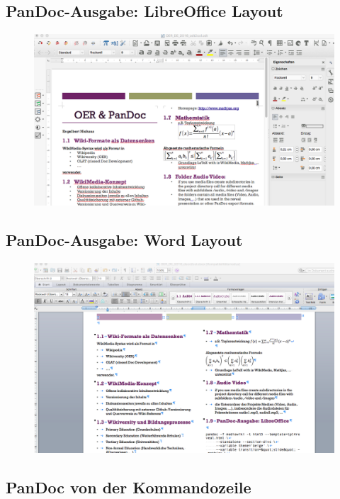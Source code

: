 \documentclass[]{article}
\begin{document}
\subsection{PanDoc-Ausgabe: LibreOffice
Layout}\label{pandoc-ausgabe-libreoffice-layout}

\begin{figure}[htbp]
\centering
\includegraphics[width=6.77083in]{./images/PanDocLibreOffice2col.png}
\caption{}
\end{figure}

\subsection{PanDoc-Ausgabe: Word
Layout}\label{pandoc-ausgabe-word-layout}

\begin{figure}[htbp]
\centering
\includegraphics[width=6.77083in]{./images/PanDocWord2col.png}
\caption{}
\end{figure}

\subsection{PanDoc von der
Kommandozeile}\label{pandoc-von-der-kommandozeile}
\end{document}
